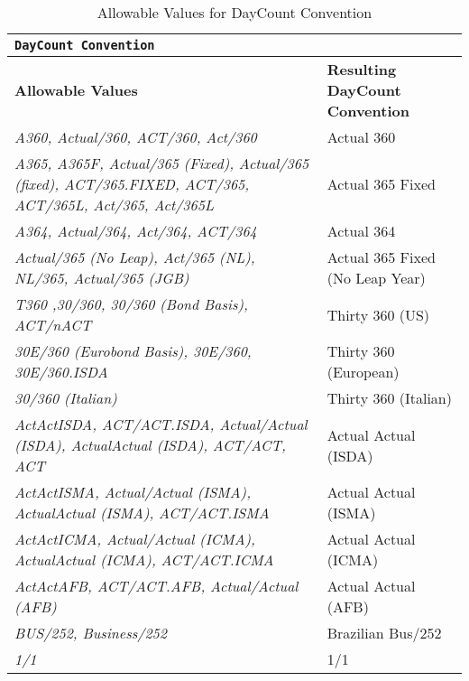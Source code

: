 \begin{table}[H]
\centering
  \begin{tabular} {|p{6cm}|p{6cm}|}
    \hline
    \multicolumn{2}{|l|}{\tt DayCount Convention}                          \\ \hline
    \bfseries{Allowable Values} & \bfseries{Resulting DayCount Convention} \\
    \hline
    \emph{A360, Actual/360, ACT/360, Act/360}& Actual 360  \\ \hline
    \emph{A365, A365F, Actual/365 (Fixed), Actual/365 (fixed), ACT/365.FIXED, ACT/365, ACT/365L, Act/365, Act/365L} & Actual 365 Fixed \\ \hline
    \emph{A364, Actual/364, Act/364, ACT/364}& Actual 364  \\ \hline
    \emph{Actual/365 (No Leap), Act/365 (NL), NL/365, Actual/365 (JGB)} & Actual 365 Fixed (No Leap Year)\\ \hline
    \emph{T360 ,30/360, 30/360 (Bond Basis), ACT/nACT} & Thirty 360 (US) \\ \hline
    \emph{30E/360 (Eurobond Basis), 30E/360, 30E/360.ISDA} & Thirty 360 (European) \\ \hline
    \emph{30/360 (Italian)} & Thirty 360 (Italian) \\ \hline
    \emph{ActActISDA, ACT/ACT.ISDA, Actual/Actual (ISDA), ActualActual (ISDA), ACT/ACT, ACT} & Actual Actual (ISDA) \\ \hline
    \emph{ActActISMA, Actual/Actual (ISMA), ActualActual (ISMA), ACT/ACT.ISMA} & Actual Actual (ISMA) \\ \hline
    \emph{ActActICMA, Actual/Actual (ICMA), ActualActual (ICMA), ACT/ACT.ICMA} & Actual Actual (ICMA) \\ \hline
    \emph{ActActAFB, ACT/ACT.AFB, Actual/Actual (AFB)} & Actual Actual (AFB) \\ \hline
    \emph{BUS/252, Business/252} & Brazilian Bus/252 \\ \hline
    \emph{1/1} & 1/1  \\ \hline
  \end{tabular}
  \caption{Allowable Values for DayCount Convention}
  \label{tab:daycount}
\end{table}

